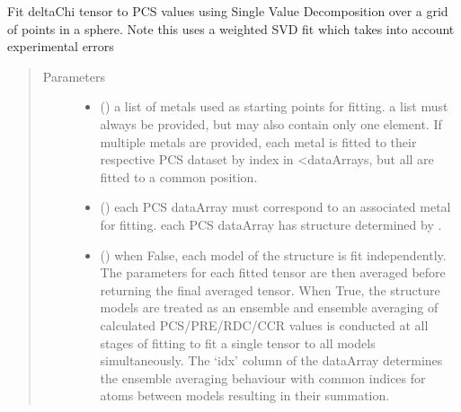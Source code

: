 \documentclass[a4paper,10pt,english,openany,oneside]{sphinxmanual}
\begin{document}
\begin{fulllineitems}
\label{\detokenize{reference/generated/paramagpy.fit.svd_gridsearch_fit_metal_from_pcs:paramagpy.fit.svd_gridsearch_fit_metal_from_pcs}}
\sphinxAtStartPar
Fit deltaChi tensor to PCS values using Single Value Decomposition over
a grid of points in a sphere.
Note this uses a weighted SVD fit which takes into account
experimental errors
\begin{quote}\begin{description}
\item[{Parameters}] \leavevmode\begin{itemize}
\item {} 
\sphinxAtStartPar
{} () \textendash{} a list of metals used as starting points for fitting.
a list must always be provided, but may also contain
only one element. If multiple metals are provided, each metal
is fitted to their respective PCS dataset by index in \textless{}dataArrays,
but all are fitted to a common position.

\item {} 
\sphinxAtStartPar
{} () \textendash{} each PCS dataArray must correspond to an associated metal for fitting.
each PCS dataArray has structure determined by
{\hyperref[\detokenize{reference/generated/paramagpy.protein.CustomStructure.parse:paramagpy.protein.CustomStructure.parse}]{}}.

\item {} 
\sphinxAtStartPar
{} (\sphinxstyleliteralemphasis{\sphinxupquote{, }}) \textendash{} when False, each model of the structure is fit independently.
The parameters for each fitted tensor are then averaged before
returning the final averaged tensor.
When True, the structure models are treated as an ensemble and
ensemble averaging of calculated PCS/PRE/RDC/CCR values is
conducted at all stages of fitting to fit a single tensor to all
models simultaneously. The ‘idx’ column of the dataArray
determines the ensemble averaging behaviour with common indices
for atoms between models resulting in their summation.


\end{itemize}
\end{description}
\end{quote}
\end{fulllineitems}
\end{document}
